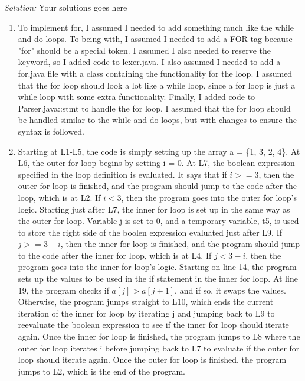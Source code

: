 \documentclass[a4paper, 11pt]{article}
\newenvironment{solution}
    {\textit{Solution:}}
    {}
\begin{document}
\begin{solution}
    Your solutions goes here
    \begin{enumerate}[a]
        \item To implement for, I assumed I needed to add something much like the while and do loops. To being with, I assumed I needed to add a FOR tag
              because "for" should be a special token. I assumed I also needed to reserve the keyword, so I added code to lexer.java. I also assumed I needed to add a for.java
              file with a class containing the functionality for the loop. I assumed that the for loop should look a lot like a while loop, since a for loop is just a while loop
              with some extra functionality. Finally, I added code to Parser.java::stmt to handle the for loop. I assumed that the for loop should be handled similar to the while
              and do loops, but with changes to ensure the syntax is followed.

        \item Starting at L1-L5, the code is simply setting up the array a = \{1, 3, 2, 4\}. At L6, the outer for loop begins by setting i = 0. At L7, the boolean
              expression specified in the loop definition is evaluated. It says that if $i >= 3$, then the outer for loop is finished, and the program should jump to
              the code after the loop, which is at L2. If $i < 3$, then the program goes into the outer for loop's logic. Starting just after L7, the inner for loop
              is set up in the same way as the outer for loop. Variable j is set to 0, and a temporary variable, t5, is used to store the right side of the boolen expression evaluated just after
              L9. If $j >= 3 - i$, then the inner for loop is finished, and the program should jump to the code after the inner for loop, which is at L4. If $j < 3 - i$, then the program goes into the inner for loop's logic.
              Starting on line 14, the program sets up the values to be used in the if statement in the inner for loop. At line 19, the program checks if $a[j] > a[j+1]$,
              and if so, it swaps the values. Otherwise, the program jumps straight to L10, which ends the current iteration of the inner for loop by iterating j and
              jumping back to L9 to reevaluate the boolean expression to see if the inner for loop should iterate again. Once the inner for loop is finished, the program
              jumps to L8 where the outer for loop iterates i before jumping back to L7 to evaluate if the outer for loop should iterate again. Once the outer for loop is finished, the program jumps to L2, which is the end of the program.


\end{enumerate}
\end{solution}
\end{document}
